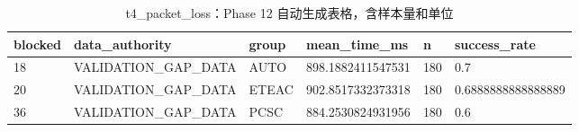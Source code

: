 \begin{table}[htbp]
\centering
\caption{t4_packet_loss：Phase 12 自动生成表格，含样本量和单位}
\begin{tabular}{llllll}
\hline
blocked & data_authority & group & mean_time_ms & n & success_rate \\
\hline
18 & VALIDATION\_GAP\_DATA & AUTO & 898.1882411547531 & 180 & 0.7 \\
20 & VALIDATION\_GAP\_DATA & ETEAC & 902.8517332373318 & 180 & 0.6888888888888889 \\
36 & VALIDATION\_GAP\_DATA & PCSC & 884.2530824931956 & 180 & 0.6 \\
\hline
\end{tabular}
\end{table}
